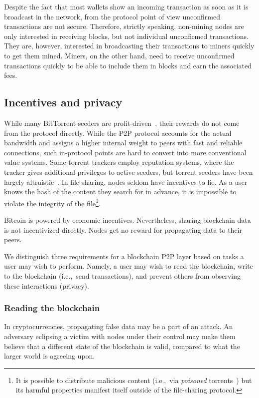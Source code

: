 Despite the fact that most wallets show an incoming transaction as soon as it is broadcast in the network, from the protocol point of view unconfirmed transactions are not secure.
Therefore, strictly speaking, non-mining nodes are only interested in receiving blocks, but not individual unconfirmed transactions.
They are, however, interested in broadcasting their transactions to miners quickly to get them mined.
Miners, on the other hand, need to receive unconfirmed transactions quickly to be able to include them in blocks and earn the associated fees.



\subsection{Incentives and privacy}

While many BitTorrent seeders are profit-driven~\cite{Rumin2010}, their rewards do not come from the protocol directly.
While the P2P protocol accounts for the actual bandwidth and assigns a higher internal weight to peers with fast and reliable connections, such in-protocol points are hard to convert into more conventional value systems.
Some torrent trackers employ reputation systems, where the tracker gives additional privileges to active seeders, but torrent seeders have been largely altruistic~\cite{Rehn2004}.
In file-sharing, nodes seldom have incentives to lie.
As a user knows the hash of the content they search for in advance, it is impossible to violate the integrity of the file\footnote{It is possible to distribute malicious content (i.e.,~via \textit{poisoned} torrents~\cite{Lou2006}) but its harmful properties manifest itself outside of the file-sharing protocol.}.

Bitcoin is powered by economic incentives.
Nevertheless, sharing blockchain data is not incentivized directly.
Nodes get no reward for propagating data to their peers.

We distinguish three requirements for a blockchain P2P layer based on tasks a user may wish to perform.
Namely, a user may wish to read the blockchain, write to the blockchain (i.e.,~send transactions), and prevent others from observing these interactions (privacy).

\subsubsection*{Reading the blockchain}
In cryptocurrencies, propagating false data may be a part of an attack.
An adversary eclipsing a victim with nodes under their control may make them believe that a different state of the blockchain is valid, compared to what the larger world is agreeing upon.

